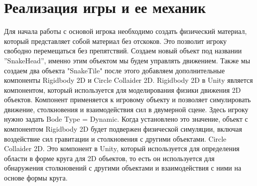 \section{\label{}Реализация игры и ее механик}
Для начала работы с основой игрока необходимо создать физический
материал, который представляет собой материал без отскоков. Это позволит
игроку свободно перемещаться без препятствий. Создаем новый объект под названии ”SnakeHead”, именно этим объектом мы будем управлять движением. Также мы создаем два объекта "SnakeTile" после этого добавляем дополнительные компоненты Rigidbody 2D и Circle Collaider 2D.
Rigidbody 2D в Unity является компонентом, который используется для
моделирования физики движения 2D объектов. Компонент применяется к игровому объекту и позволяет симулировать движение, столкновения и взаимодействия сил в двумерной сцене. Здесь игроку нужно задать Bode Type = Dynamic. Когда установлено это значение, объект с компонентом Rigidbody 2D будет подвержен физической симуляции, включая воздействие сил гравитации и столкновения с другими объектами.
Circle Collaider 2D. Это компонент в Unity, который используется для
определения области в форме круга для 2D объектов, то есть он используется для обнаружения столкновений с другими объектами и взаимодействия с
ними на основе формы круга.

